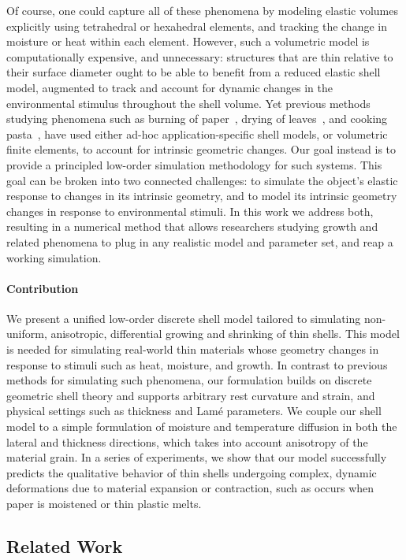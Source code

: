 \documentclass[timestamp,acmtog]{acmart}
\begin{document}
Of course, one could capture all of these phenomena by modeling elastic volumes explicitly using tetrahedral or hexahedral elements, and tracking the change in moisture or heat within each element. However, such a volumetric model is computationally expensive, and unnecessary: structures that are thin relative to their surface diameter ought to be able to benefit from a reduced elastic shell model, augmented to track and account for dynamic changes in the environmental stimulus throughout the shell volume. Yet previous methods studying phenomena such as burning of paper~\cite{Liu2009}, drying of leaves~\cite{Jeong2013}, and cooking pasta~\cite{Wang2017}, have used either ad-hoc application-specific shell models, or volumetric finite elements, to account for intrinsic geometric changes. Our goal instead is to provide a principled low-order simulation methodology for such systems. This goal can be broken into two connected challenges: to simulate the object's elastic response to changes in its intrinsic geometry, and to model its intrinsic geometry changes in response to environmental stimuli. In this work we address both, resulting in a numerical method that allows researchers studying growth and related phenomena to plug in any realistic model and parameter set, and reap a working simulation.

\paragraph{Contribution} We present a unified low-order discrete shell model tailored to simulating non-uniform, anisotropic, differential growing and shrinking of thin shells. This model is needed for simulating real-world thin materials whose geometry changes in response to stimuli such as heat, moisture, and growth. In contrast to previous methods for simulating such phenomena, our formulation builds on discrete geometric shell theory and supports arbitrary rest curvature and strain, and physical settings such as thickness and Lam\'{e} parameters. We couple our shell model to a simple formulation of moisture and temperature diffusion in both the lateral and thickness directions, which takes into account anisotropy of the material grain. In a series of experiments, we show that our model successfully predicts the qualitative behavior of thin shells undergoing complex, dynamic deformations due to material expansion or contraction, such as occurs when paper is moistened or thin plastic melts.

\subsection{Related Work}
\end{document}
